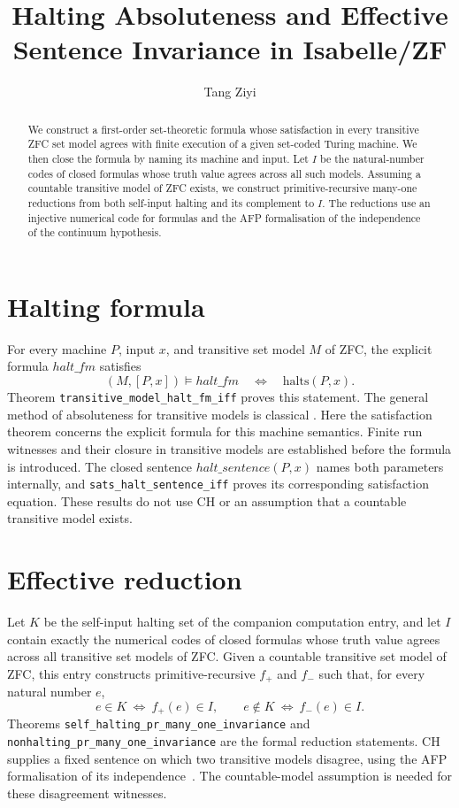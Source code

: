 \documentclass[11pt,a4paper]{article}
\begin{document}
\title{Halting Absoluteness and Effective Sentence Invariance in Isabelle/ZF}
\author{Tang Ziyi}
\maketitle

\begin{abstract}
We construct a first-order set-theoretic formula whose satisfaction in every
transitive ZFC set model agrees with finite execution of a given set-coded
Turing machine. We then close the formula by naming its machine and input.
Let $I$ be the natural-number codes of closed formulas whose truth value
agrees across all such models. Assuming a countable transitive model of
ZFC exists, we construct primitive-recursive many-one reductions from both
self-input halting and its complement to $I$. The reductions use an
injective numerical code for formulas and the AFP formalisation of the
independence of the continuum hypothesis.
\end{abstract}

\tableofcontents

\section{Halting formula}
For every machine $P$, input $x$, and transitive set model $M$ of ZFC, the
explicit formula $\mathit{halt\_fm}$ satisfies
\[
  (M,[P,x])\models\mathit{halt\_fm}
  \quad\Longleftrightarrow\quad
  \mathrm{halts}(P,x).
\]
Theorem \texttt{transitive\_model\_halt\_fm\_iff} proves this statement.
The general method of absoluteness for transitive models is classical
\cite[Chapter~12]{jech}. Here the satisfaction theorem concerns the explicit
formula for this machine semantics. Finite run witnesses and their closure
in transitive models are established before the formula is introduced. The
closed sentence
$\mathit{halt\_sentence}(P,x)$ names both parameters internally, and
\texttt{sats\_halt\_sentence\_iff} proves its corresponding satisfaction
equation. These results do not use CH or an assumption that a countable
transitive model exists.

\section{Effective reduction}
Let $K$ be the self-input halting set of the companion computation entry,
and let $I$ contain exactly the numerical codes of closed formulas whose
truth value agrees across all transitive set models of ZFC. Given a
countable transitive set model of ZFC, this entry constructs
primitive-recursive $f_+$ and $f_-$ such that, for every natural number $e$,
\[
  e\in K\ \Longleftrightarrow\ f_+(e)\in I,
  \qquad
  e\notin K\ \Longleftrightarrow\ f_-(e)\in I.
\]
Theorems \texttt{self\_halting\_pr\_many\_one\_invariance} and
\texttt{nonhalting\_pr\_many\_one\_invariance} are the formal reduction
statements. CH supplies a fixed sentence on which two transitive models
disagree, using the AFP formalisation of its independence~\cite{afp-ch}.
The countable-model assumption is needed for these disagreement witnesses.
\end{document}

